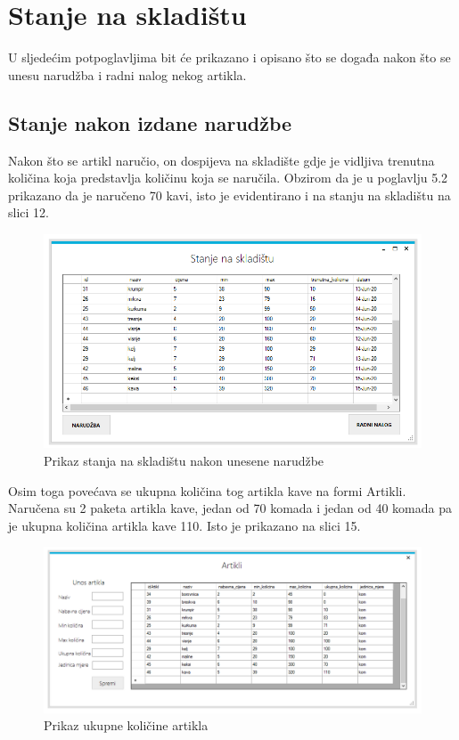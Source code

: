 \documentclass{foi}
\begin{document}
\newpage
\section{Stanje na skladištu}
U sljedećim potpoglavljima bit će prikazano i opisano što se događa nakon što se unesu narudžba i radni nalog nekog artikla.
\subsection{Stanje nakon izdane narudžbe}
Nakon što se artikl naručio, on dospijeva na skladište gdje je vidljiva trenutna količina koja predstavlja količinu koja se naručila. Obzirom da je u poglavlju 5.2 prikazano da je naručeno 70 kavi, isto je evidentirano i na stanju na skladištu na slici 12.
\begin{figure}[h]
    \centering 
    \includegraphics[width=1.0\textwidth]{slike/stanje kave.PNG}
    \caption{Prikaz stanja na skladištu nakon unesene narudžbe}
    \label{slika-14}
\end{figure}

Osim toga povećava se ukupna količina tog artikla kave na formi Artikli. Naručena su 2 paketa artikla kave, jedan od 70 komada i jedan od 40 komada pa je ukupna količina artikla kave 110. Isto je prikazano na slici 15.
\newpage
\begin{figure}[h]
    \centering 
    \includegraphics[width=1.0\textwidth]{slike/ukupna kol kave.PNG}
    \caption{Prikaz ukupne količine artikla}
    \label{slika-15}
\end{figure}
\end{document}

